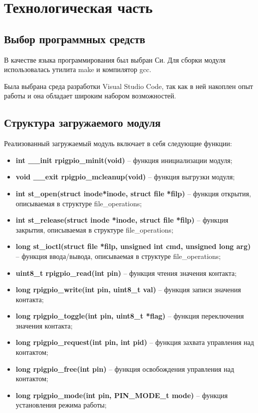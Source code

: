 \section{Технологическая часть}

\subsection{Выбор программных средств}
В качестве языка программирования был выбран Си. Для сборки модуля использовалась утилита make и компилятор gcc.

Была выбрана среда разработки Visual Studio Code, так как в ней накоплен опыт работы и она обладает широким набором возможностей.

\subsection{Структура загружаемого модуля}

Реализованный загружаемый модуль включает в себя следующие функции:
\begin{itemize}
	\item \textbf{int \_\_init rpigpio\_minit(void)} -- функция инициализации модуля;
	\item \textbf{void \_\_exit rpigpio\_mcleanup(void)} -- функция выгрузки модуля;
	
	\item \textbf{int st\_open(struct inode*inode, struct file *filp)} -- функция открытия, описываемая в структуре file\_operations;
	\item \textbf{int st\_release(struct inode *inode, struct file *filp)} -- функция закрытия, описываемая в структуре file\_operations;
	\item \textbf{long st\_ioctl(struct file *filp, unsigned int cmd, unsigned long arg)} -- функция ввода/вывода, описываемая в структуре file\_operations;
	
	\item \textbf{uint8\_t rpigpio\_read(int pin)} -- функция чтения значения контакта;
	\item \textbf{long rpigpio\_write(int pin, uint8\_t val)} -- функция записи значения контакта;
	\item \textbf{long rpigpio\_toggle(int pin, uint8\_t *flag)} -- функция переключения значения контакта;
	
	\item \textbf{long rpigpio\_request(int pin, int pid)} -- функция захвата управления над контактом;
	\item \textbf{long rpigpio\_free(int pin)} -- функция освобождения управления над контактом;
	
	\item \textbf{long rpigpio\_mode(int pin, PIN\_MODE\_t mode)} -- функция установления режима работы;
\end{itemize}

